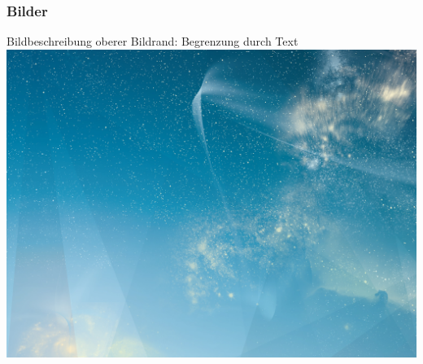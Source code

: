 \begin{frame}
    \frametitle{Bilder}

Bildbeschreibung\newline
oberer Bildrand: Begrenzung durch Text\\[\baselineskip]

\includegraphics[width=\textwidth, height=.55\textheight]{./Ressourcen/_Bilder/SternenhimmelQuer.jpg}%

\end{frame}
\clearpage



